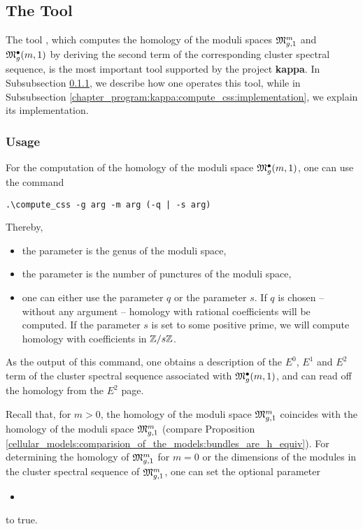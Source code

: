 \subsection{The Tool }
\label{chapter_program:kappa:compute_css}

The tool , which computes the homology of the moduli spaces $\Modspc[1]$ and $\ModspcRad[1]$
by deriving the second term of the corresponding cluster spectral sequence,
is the most important tool supported by the project {\bf kappa}.
In Subsubsection \ref{chapter_program:kappa:compute_css:usage}, we describe 
how one operates this tool, 
while in Subsubsection \ref{chapter_program:kappa:compute_css:implementation},
we explain its implementation. 

\subsubsection{Usage}
\label{chapter_program:kappa:compute_css:usage}

For the computation of the homology of the moduli space $\ModspcRad[1]$, 
one can use the command
\begin{lstlisting}
.\compute_css -g arg -m arg (-q | -s arg)
\end{lstlisting}
Thereby,
\begin{itemize}
\item the parameter  is the genus of the moduli space,
\item the parameter  is the number of punctures of the moduli space,
\item one can either use the parameter $q$ or the parameter $s$. 
      If $q$ is chosen -- without any argument -- homology with rational coefficients will be computed.
      If the parameter $s$ is set to some positive prime, we will compute homology with coefficients in $\Z/s\Z$.
\end{itemize}
As the output of this command, one obtains a description of the $E^0$, $E^1$ and $E^2$ term of the cluster spectral sequence associated with $\ModspcRad[1]$,
and can read off the homology from the $E^2$ page.  

Recall that, for $m > 0$, the homology of the moduli space $\Modspc[1]$ coincides with the homology of the moduli space $\Modspc[1]$ 
(compare Proposition \ref{cellular_models:comparision_of_the_models:bundles_are_h_equiv}).
For determining the homology of $\Modspc[1]$ for $m = 0$ 
or the dimensions of the modules in the cluster spectral sequence of $\Modspc[1]$, one can set the optional parameter
\begin{itemize}
 \item {}
\end{itemize}
to true.

